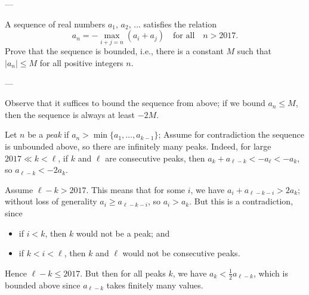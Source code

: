 
---

A sequence of real numbers $a_1$, $a_2$, $\ldots$ satisfies the relation
\[a_n=-\max_{i+j=n}(a_i+a_j)\quad\text{for all}\quad n>2017.\]
Prove that the sequence is bounded, i.e., there is a constant $M$ such that $|a_n|\le M$ for all positive integers $n$.

---

Observe that it suffices to bound the sequence from above; if we bound $a_n\le M$, then the sequence is always at least $-2M$.

Let $n$ be a \emph{peak} if $a_n>\min\{a_1,\ldots,a_{k-1}\}$; Assume for contradiction the sequence is unbounded above, so there are infinitely many peaks. Indeed, for large $2017\ll k<\ell$, if $k$ and $\ell$ are consecutive peaks, then $a_k+a_{\ell-k}<-a_\ell<-a_k$, so $a_{\ell-k}<-2a_k$. 

Assume $\ell-k>2017$. This means that for some $i$, we have $a_i+a_{\ell-k-i}>2a_k$; without loss of generality $a_i\ge a_{\ell-k-i}$, so $a_i>a_k$. But this is a contradiction, since
\begin{itemize}[itemsep=0em]
    \item if $i<k$, then $k$ would not be a peak; and
    \item if $k<i<\ell$, then $k$ and $\ell$ would not be consecutive peaks.
\end{itemize}

Hence $\ell-k\le2017$. But then for all peaks $k$, we have $a_k<\frac12a_{\ell-k}$, which is bounded above since $a_{\ell-k}$ takes finitely many values.
